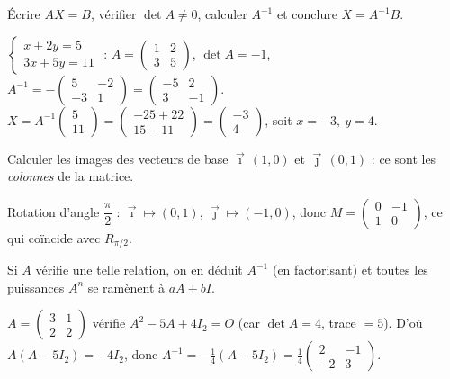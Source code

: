 Écrire $AX=B$, vérifier $\det A\neq0$, calculer $A^{-1}$ et conclure $X=A^{-1}B$.
\begin{exemple}
$\left\{\begin{array}{l}x+2y=5\\3x+5y=11\end{array}\right.$ : $A=\begin{pmatrix}1&2\\3&5\end{pmatrix}$,
$\det A=-1$, $A^{-1}=-\begin{pmatrix}5&-2\\-3&1\end{pmatrix}=\begin{pmatrix}-5&2\\3&-1\end{pmatrix}$.
$X=A^{-1}\begin{pmatrix}5\\11\end{pmatrix}=\begin{pmatrix}-25+22\\15-11\end{pmatrix}=\begin{pmatrix}-3\\4\end{pmatrix}$,
soit $x=-3,\ y=4$.
\end{exemple}

Calculer les images des vecteurs de base $\vec\imath\,(1,0)$ et $\vec\jmath\,(0,1)$ : ce sont
les \emph{colonnes} de la matrice.
\begin{exemple}
Rotation d'angle $\dfrac\pi2$ : $\vec\imath\mapsto(0,1)$, $\vec\jmath\mapsto(-1,0)$, donc
$M=\begin{pmatrix}0&-1\\1&0\end{pmatrix}$, ce qui coïncide avec $R_{\pi/2}$.
\end{exemple}

Si $A$ vérifie une telle relation, on en déduit $A^{-1}$ (en factorisant) et toutes les puissances
$A^n$ se ramènent à $aA+bI$.
\begin{exemple}
$A=\begin{pmatrix}3&1\\2&2\end{pmatrix}$ vérifie $A^2-5A+4I_2=O$ (car $\det A=4$, trace $=5$).
D'où $A(A-5I_2)=-4I_2$, donc $A^{-1}=-\tfrac14(A-5I_2)=\tfrac14\begin{pmatrix}2&-1\\-2&3\end{pmatrix}$.
\end{exemple}

